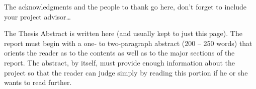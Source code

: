 \documentclass[
12pt,
oneside, 
onehalfspacing, 
nolistspacing, 
parskip, 
chapterinoneline, 
]{AASTCOMPUTER}
\author{Student Name}
\begin{document}
\frontmatter 
\pagestyle{plain} 

\titlep

\declarationp

\examinersp


\begin{acknowledgmentsp}
The acknowledgments and the people to thank go here, don't forget to include your project advisor\ldots
\end{acknowledgmentsp}

\cleardoublepage



\begin{abstractp}
The Thesis Abstract is written here (and usually kept to just this page). The report must begin with a one- to two-paragraph abstract (200 – 250 words) that orients the reader as to the contents as well as to the major sections of the report. The abstract, by itself, must provide enough information about the project so that the reader can judge simply by reading this portion if he or she wants to read further.
\end{abstractp}
\end{document}
